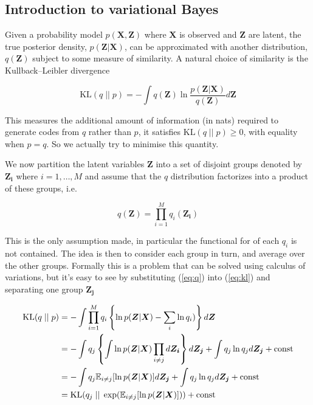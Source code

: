 \documentclass{article}
\begin{document}
\subsection{Introduction to variational Bayes}

Given a probability model $p(\boldsymbol{X}, \boldsymbol{Z})$ where $\boldsymbol{X}$ is observed and $\boldsymbol{Z}$ are latent, the true posterior density, $p(\boldsymbol{Z} | \boldsymbol{X})$, can be approximated with another distribution, $q(\boldsymbol{Z})$ subject to some measure of similarity. A natural choice of similarity is the Kullback–Leibler divergence

\begin{equation}
\label{eq:kl}
   \text{KL} (q\; ||\; p) = -\int q(\boldsymbol{Z}) \ln \frac{p(\boldsymbol{Z} | \boldsymbol{X})}{q(\boldsymbol{Z})} d\boldsymbol{Z}
\end{equation}

This measures the additional amount of information (in nats) required to generate codes from $q$ rather than $p$, it satisfies $\text{KL}(q\; ||\; p) \ge 0$, with equality when $p = q$. So we actually try to minimise this quantity.

We now partition the latent variables $\boldsymbol{Z}$ into a set of disjoint groups denoted by $\boldsymbol{Z_i}$ where $i = 1, \dots, M$ and assume that the $q$ distribution factorizes into a product of these groups, i.e.

\begin{equation}
\label{eq:q}
  q(\boldsymbol{Z}) = \prod_{i = 1}^M q_i(\boldsymbol{Z_i})
\end{equation}

This is the only assumption made, in particular the functional for of each $q_i$ is not contained. The idea is then to consider each group in turn, and average over the other groups. Formally this is a problem that can be solved using calculus of variations, but it's easy to see by substituting (\ref{eq:q}) into (\ref{eq:kl}) and separating one group $\boldsymbol{Z_j}$

\begin{align}
    \text{KL}(q\; ||\; p) &= -\int \prod_{i = 1}^M q_i \left\{ \ln p(\boldsymbol{Z} | \boldsymbol{X}) - \sum_i \ln q_i) \right\} d \boldsymbol{Z}\notag \\
    &= -\int q_j \left\{ \int \ln p(\boldsymbol{Z} | \boldsymbol{X}) \prod_{i \ne j} d \boldsymbol{Z_i} \right\} d \boldsymbol{Z_j} + \int q_j \ln q_j d \boldsymbol{Z_j} + \text{const}\notag\\
    &= -\int q_j \mathbb{E}_{i \ne j}[\ln p(\boldsymbol{Z} | \boldsymbol{X})] d \boldsymbol{Z_j} + \int q_j \ln q_j d \boldsymbol{Z_j} + \text{const}\notag\\
    &= \text{KL}(q_j\; ||\; \exp (\mathbb{E}_{i \ne j}[\ln p(\boldsymbol{Z} | \boldsymbol{X})])) + \text{const}
\end{align}
\end{document}
